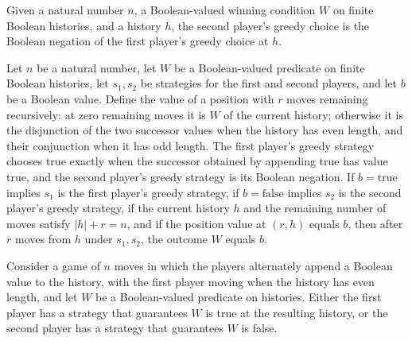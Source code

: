 \begin{definition}
\label{Complexity.Game.secondGreedy}
\leanok
{}
Given a natural number $n$, a Boolean-valued winning condition $W$ on finite Boolean
histories, and a history $h$, the second player's greedy choice is the Boolean negation
of the first player's greedy choice at $h$.
\end{definition}

\begin{theorem}
\label{Complexity.Game.winner_of_value}
\leanok
{}
Let $n$ be a natural number, let $W$ be a Boolean-valued predicate on finite Boolean
histories, let $s_1,s_2$ be strategies for the first and second players, and let $b$ be
a Boolean value. Define the value of a position with $r$ moves remaining recursively: at
zero remaining moves it is $W$ of the current history; otherwise it is the disjunction
of the two successor values when the history has even length, and their conjunction when
it has odd length. The first player's greedy strategy chooses true exactly when the
successor obtained by appending true has value true, and the second player's greedy
strategy is its Boolean negation. If $b=\mathrm{true}$ implies $s_1$ is the first
player's greedy strategy, if $b=\mathrm{false}$ implies $s_2$ is the second player's
greedy strategy, if the current history $h$ and the remaining number of moves satisfy
$|h|+r=n$, and if the position value at $(r,h)$ equals $b$, then after $r$ moves from
$h$ under $s_1,s_2$, the outcome $W$ equals $b$.
\end{theorem}

\begin{theorem}
\label{Complexity.Game.determined}
\leanok
{}
Consider a game of $n$ moves in which the players alternately append a Boolean value to
the history, with the first player moving when the history has even length, and let $W$
be a Boolean-valued predicate on histories. Either the first player has a strategy that
guarantees $W$ is true at the resulting history, or the second player has a strategy
that guarantees $W$ is false.
\end{theorem}
